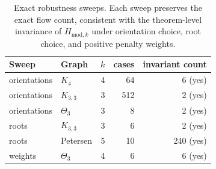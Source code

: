 \begin{table}[t]
\centering
\small
\caption{Exact robustness sweeps. Each sweep preserves the exact flow count, consistent with the theorem-level invariance of $H_{\mathrm{mod},k}$ under orientation choice, root choice, and positive penalty weights.}
\label{tab:robustness-summary}
\begin{tabular}{l l r r r}
\hline
Sweep & Graph & $k$ & cases & invariant count \\
\hline
orientations & $K_4$ & 4 & 64 & 6 (yes) \\
orientations & $K_{3,3}$ & 3 & 512 & 2 (yes) \\
orientations & $\Theta_3$ & 3 & 8 & 2 (yes) \\
roots & $K_{3,3}$ & 3 & 6 & 2 (yes) \\
roots & Petersen & 5 & 10 & 240 (yes) \\
weights & $\Theta_3$ & 4 & 6 & 6 (yes) \\
\hline
\end{tabular}
\end{table}
